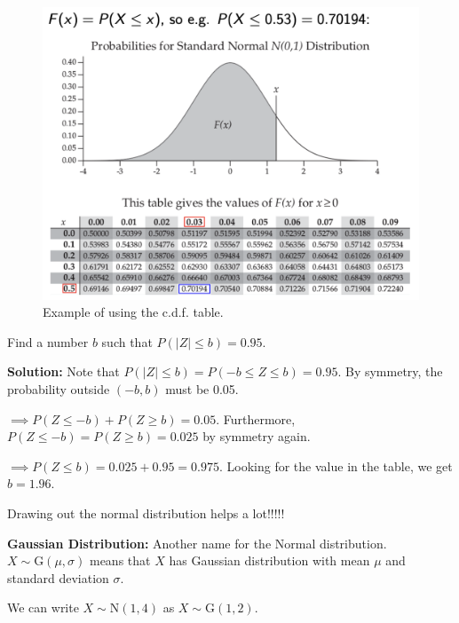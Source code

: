 \begin{figure}[htbp]
    \center
    \includegraphics[scale=0.6]{img/N-table-example.png}
    \caption{Example of using the c.d.f. table.}
\end{figure}


\begin{example}
    Find a number $b$ such that $P(|Z| \leq b) = 0.95$. 

    \textbf{Solution:} Note that $P(|Z| \leq b) = P(-b \leq Z \leq b) = 0.95$. By symmetry, the probability outside $(-b,b)$ must be 0.05.

    $\implies P(Z \leq -b) + P(Z \geq b) = 0.05$. Furthermore, $P(Z \leq -b) = P(Z \geq b) = 0.025$ by symmetry again.

    $\implies P(Z \leq b) = 0.025 + 0.95 = 0.975.$ Looking for the value in the table, we get $b = 1.96$.
\end{example}

\begin{remark}
    Drawing out the normal distribution helps a lot!!!!! \\
\end{remark}

\textbf{Gaussian Distribution:} Another name for the Normal distribution. $X \sim \text{G}(\mu, \sigma)$ means that $X$ has  Gaussian distribution with mean $\mu$ and standard deviation $\sigma$. 

\begin{example}
    We can write $X \sim \text{N}(1,4)$ as $X \sim \text{G}(1,2)$.
\end{example}

